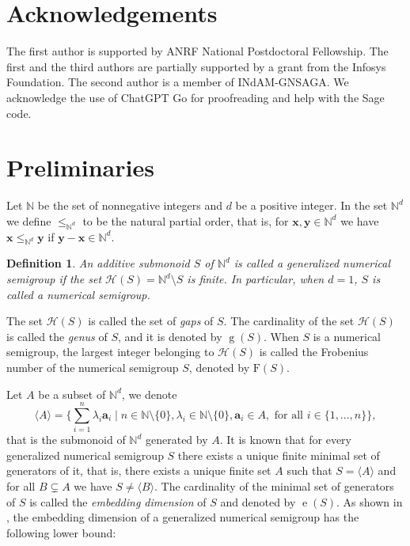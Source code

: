 \documentclass[12pt]{amsart}
\theoremstyle{plain}
\theoremstyle{theorem}
\newtheorem{definition}{Definition}[section]
\theoremstyle{remark}
\begin{document}
\section*{Acknowledgements}
The first author is supported by ANRF National Postdoctoral Fellowship. 
The first and the third authors are partially supported by a grant from the Infosys Foundation. The second author is a member of INdAM-GNSAGA. We acknowledge the use of ChatGPT Go for proofreading and help with the Sage code.

\section{Preliminaries}\label{sec:prelim}

Let $\mathbb{N}$ be the set of nonnegative integers and $d$ be a positive integer. In the set $\mathbb{N}^d$ we define $\leq_{\mathbb{N}^d}$ to be the natural partial order, that is, for $\mathbf{x},\mathbf{y}\in \mathbb{N}^d$ we have $\mathbf{x}\leq_{\mathbb{N}^d} \mathbf{y}$ if $\mathbf{y}-\mathbf{x} \in \mathbb{N}^d$.


\begin{definition}
	{\rm An additive submonoid $S$ of $\mathbb{N}^d$ is called  a \textit{generalized numerical semigroup} if the set $\mathcal{H}(S)=\mathbb{N}^d\setminus S$ is finite. In particular, when $d=1$, $S$ is called a \textit{numerical semigroup}.}
\end{definition}


  The set $\mathcal{H}(S)$ is called the set of \textit{gaps} of $S$. The cardinality of the set $\mathcal{H}(S)$ is called the \textit{genus} of $S$, and it is denoted by $\operatorname{g}(S)$. When $S$ is a numerical semigroup, the largest integer belonging to $\mathcal{H}(S)$ is called the Frobenius number of the numerical semigroup $S$, denoted by $\mathrm{F}(S)$.  
  
  Let $A$ be a subset of $\mathbb{N}^d$, we denote $$\langle A \rangle=\{\sum_{i=1}^n \lambda_i \mathbf{a}_i\mid n \in \mathbb{N}\setminus \{0\}, \lambda_i \in \mathbb{N}\setminus \{0\}, \mathbf{a}_i \in A, \text{ for all } i\in \{1,\ldots,n\}\},$$ that is the submonoid of $\mathbb{N}^d$ generated by $A$. It is known that for every generalized numerical semigroup $S$ there exists a unique finite minimal set of generators of it, that is, there exists a unique finite set $A$ such that $S=\langle A \rangle$ and for all $B\subsetneq A$ we have $S\neq \langle B \rangle$. The cardinality of the minimal set of generators of $S$ is called the \textit{embedding dimension} of $S$ and denoted by $\operatorname{e}(S)$. As shown in \cite[Theorem 11]{garcia2018extension}, the embedding dimension of a generalized numerical semigroup has the following lower bound:
\end{document}
